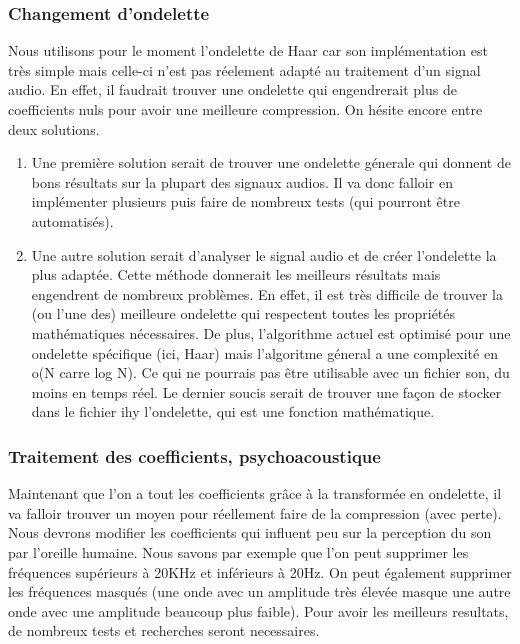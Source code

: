 \documentclass[a4paper,12pt]{article}
\begin{document}
\subsubsection{Changement d'ondelette}
Nous utilisons pour le moment l'ondelette de Haar car son
implémentation est très simple mais celle-ci n'est pas réelement
adapté au traitement d'un signal audio. En effet, il faudrait trouver
une ondelette qui engendrerait plus de coefficients nuls pour avoir
une meilleure compression. On hésite encore entre deux solutions.\\
\begin{enumerate}
\item 
  Une première solution serait de trouver une ondelette génerale qui
  donnent de bons résultats sur la plupart des signaux audios. Il va
  donc falloir en implémenter plusieurs puis faire de nombreux tests
  (qui pourront être automatisés).  
\item 
  Une autre solution serait d'analyser le signal audio et de créer
  l'ondelette la plus adaptée. Cette méthode donnerait les meilleurs
  résultats mais engendrent de nombreux problèmes. En effet, il est
  très difficile de trouver la (ou l'une des) meilleure ondelette qui
  respectent toutes les propriétés mathématiques nécessaires. De plus,
  l'algorithme actuel est optimisé pour une ondelette spécifique (ici,
  Haar) mais l'algoritme géneral a une complexité en o(N carre log N).
  Ce qui ne pourrais pas être utilisable avec un fichier son, du
  moins en temps réel. Le dernier soucis serait de trouver une façon
  de stocker dans le fichier ihy l'ondelette, qui est une fonction
  mathématique.
\end{enumerate}
\subsubsection{Traitement des coefficients, psychoacoustique}
Maintenant que l'on a tout les coefficients grâce à la transformée en
ondelette, il va falloir trouver un moyen pour réellement faire de la
compression (avec perte). Nous devrons modifier les coefficients qui
influent peu sur la perception du son par l'oreille humaine. Nous
savons par exemple que l'on peut supprimer les fréquences supérieurs à
20KHz et inférieurs à 20Hz. On peut également supprimer les fréquences
masqués (une onde avec un amplitude très élevée masque une autre onde
avec une amplitude beaucoup plus faible). Pour avoir les meilleurs
resultats, de nombreux tests et recherches seront necessaires.
\end{document}
